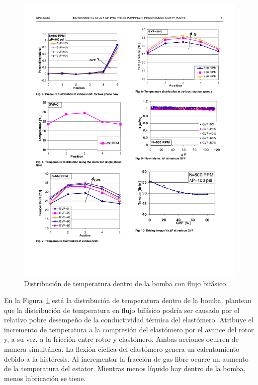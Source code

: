 \begin{figure}

\centering
		
\includegraphics[scale=1,draft=false]{distribucion_temperatura_Martin-1999-426} 


\caption{Distribución de temperatura dentro de la bomba con flujo bifásico.}

\label{fig:distribucion_temperatura_Martin-1999-426}

\end{figure}


En la Figura~\ref{fig:distribucion_temperatura_Martin-1999-426} está la distribución de temperatura dentro de la bomba. \citeauthor{Martin1999} plantean que la distribución de temperatura en flujo bifásico podría ser causado por el relativo pobre desempeño de la conductividad térmica del elastómero. Atribuye el incremento de temperatura a la compresión del elastómero por el avance del rotor y, a su vez, a la fricción entre rotor y elastómero. Ambas acciones  ocurren de manera simultánea. La flexión cíclica del elastómero genera un calentamiento debido a la histéresis. Al incrementar la fracción de gas libre ocurre un aumento de la  temperatura  del estator. Mientras menos líquido hay dentro de la bomba, menos lubricación se tiene. 

